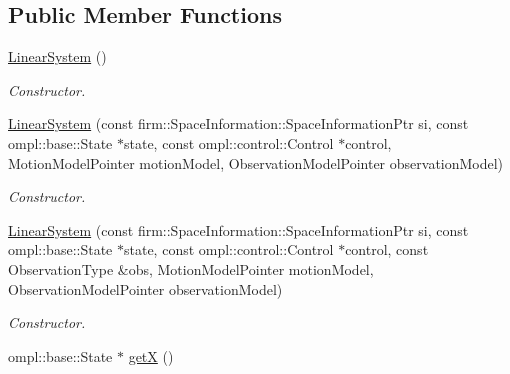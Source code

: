 \subsection*{\-Public \-Member \-Functions}
\begin{DoxyCompactItemize}
\item 
\hypertarget{class_linear_system_a3f75bddc5fb799e7daab008f415bd1fa}{\hyperlink{class_linear_system_a3f75bddc5fb799e7daab008f415bd1fa}{\-Linear\-System} ()}\label{class_linear_system_a3f75bddc5fb799e7daab008f415bd1fa}

\begin{DoxyCompactList}\small\item\em \-Constructor. \end{DoxyCompactList}\item 
\hypertarget{class_linear_system_a340ddf5ee44bbf851ceaca67f4404048}{\hyperlink{class_linear_system_a340ddf5ee44bbf851ceaca67f4404048}{\-Linear\-System} (const firm\-::\-Space\-Information\-::\-Space\-Information\-Ptr si, const ompl\-::base\-::\-State $\ast$state, const ompl\-::control\-::\-Control $\ast$control, \-Motion\-Model\-Pointer motion\-Model, \-Observation\-Model\-Pointer observation\-Model)}\label{class_linear_system_a340ddf5ee44bbf851ceaca67f4404048}

\begin{DoxyCompactList}\small\item\em \-Constructor. \end{DoxyCompactList}\item 
\hypertarget{class_linear_system_aeaaa65cf19822ff7e12312cf37ce721f}{\hyperlink{class_linear_system_aeaaa65cf19822ff7e12312cf37ce721f}{\-Linear\-System} (const firm\-::\-Space\-Information\-::\-Space\-Information\-Ptr si, const ompl\-::base\-::\-State $\ast$state, const ompl\-::control\-::\-Control $\ast$control, const \-Observation\-Type \&obs, \-Motion\-Model\-Pointer motion\-Model, \-Observation\-Model\-Pointer observation\-Model)}\label{class_linear_system_aeaaa65cf19822ff7e12312cf37ce721f}

\begin{DoxyCompactList}\small\item\em \-Constructor. \end{DoxyCompactList}\item 
\hypertarget{class_linear_system_a7d556441c0f68f6ccfdde32b72f888b6}{ompl\-::base\-::\-State $\ast$ \hyperlink{class_linear_system_a7d556441c0f68f6ccfdde32b72f888b6}{get\-X} ()}\label{class_linear_system_a7d556441c0f68f6ccfdde32b72f888b6}


\end{DoxyCompactItemize}
